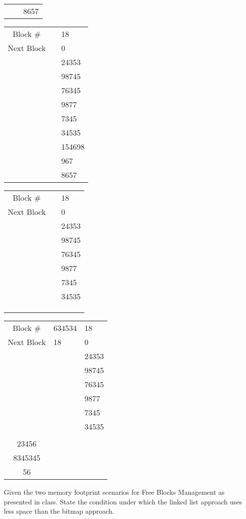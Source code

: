 \documentclass[a4paper,11pt]{exam}
\begin{document}
\begin{questions}
\begin{tabular}{|c|p{3.25em}|p{3.25em}|}
	&  & 8657 \\ \cline{1-3}
\end{tabular}
\begin{tabular}{|c|p{3.25em}|p{3.25em}|}
\hline
Block \# & & 18 \\ \cline{1-3}
Next Block & & 0 \\ \cline{1-3}
\multirow{5}{*}{} & & 24353 \\ \cline{2-3}
	&  & 98745 \\ \cline{2-3}
	&  & 76345 \\ \cline{2-3}
	&  & 9877 \\ \cline{2-3}
	&  & 7345 \\ \cline{2-3}
	&  & 34535 \\ \cline{2-3}
	&  & 154698 \\ \cline{2-3}
	&  & 967 \\ \cline{2-3}
	&  & 8657 \\ \cline{1-3}
\end{tabular}

\begin{tabular}{|c|p{3.25em}|p{3.25em}|}
\hline
Block \# & & 18 \\ \cline{1-3}
Next Block & & 0 \\ \cline{1-3}
\multirow{5}{*}{} & & 24353 \\ \cline{2-3}
	&  & 98745 \\ \cline{2-3}
	&  & 76345 \\ \cline{2-3}
	&  & 9877 \\ \cline{2-3}
	&  & 7345 \\ \cline{2-3}
	&  & 34535 \\ \cline{2-3}
	&  &  \\ \cline{2-3}
	&  &  \\ \cline{2-3}
	&  &  \\ \cline{1-3}
\end{tabular}
\begin{tabular}{|c|p{3.25em}|p{3.25em}|}
\hline
Block \# & 634534 & 18 \\ \cline{1-3}
Next Block & 18 & 0 \\ \cline{1-3}
\multirow{5}{*}{} &  & 24353 \\ \cline{2-3}
	&  & 98745 \\ \cline{2-3}
	&  & 76345 \\ \cline{2-3}
	&  & 9877 \\ \cline{2-3}
	&  & 7345 \\ \cline{2-3}
	&  & 34535 \\ \cline{2-3}
	&  &  \\ 23456 \cline{2-3}
	&  &  \\ 8345345 \cline{2-3}
	&  &  \\ 56 \cline{1-3}
\end{tabular}
Given the two memory footprint scenarios for Free Blocks Management as presented in class. State the condition under which the linked list approach uses less space than the bitmap approach.


\end{questions}
\end{document}
